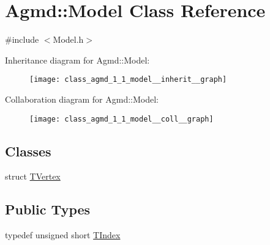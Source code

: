 \hypertarget{class_agmd_1_1_model}{\section{Agmd\+:\+:Model Class Reference}
\label{class_agmd_1_1_model}
}


{\ttfamily \#include $<$Model.\+h$>$}



Inheritance diagram for Agmd\+:\+:Model\+:\nopagebreak
\begin{figure}[H]
\begin{center}
\leavevmode
\texttt{[image: class\_agmd\_1\_1\_model\_\_inherit\_\_graph]}
\end{center}
\end{figure}


Collaboration diagram for Agmd\+:\+:Model\+:\nopagebreak
\begin{figure}[H]
\begin{center}
\leavevmode
\texttt{[image: class\_agmd\_1\_1\_model\_\_coll\_\_graph]}
\end{center}
\end{figure}
\subsection*{Classes}
\begin{DoxyCompactItemize}
\item 
struct \hyperlink{struct_agmd_1_1_model_1_1_t_vertex}{T\+Vertex}
\end{DoxyCompactItemize}
\subsection*{Public Types}
\begin{DoxyCompactItemize}
\item 
typedef unsigned short \hyperlink{class_agmd_1_1_model_aca4a6ee5402b386a0b9d0aea52c71eaa}{T\+Index}
\end{DoxyCompactItemize}
